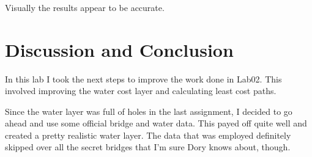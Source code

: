 \documentclass[article,12pt]{article}
\numberwithin{equation}{section}
\begin{document}
\begin{adjustwidth}{-.8in}{-.8in}
\begin{center}
	\\
\\
	\\
\end{center}
\end{adjustwidth}

Visually the results appear to be accurate.

\section{Discussion and Conclusion}

In this lab I took the next steps to improve the work done in Lab02. This involved improving the water cost layer and calculating least cost paths. 

Since the water layer was full of holes in the last assignment, I decided to go ahead and use some official bridge and water data. This payed off quite well and created a pretty realistic water layer. The data that was employed definitely skipped over all the secret bridges that I'm sure Dory knows about, though.
\end{document}
